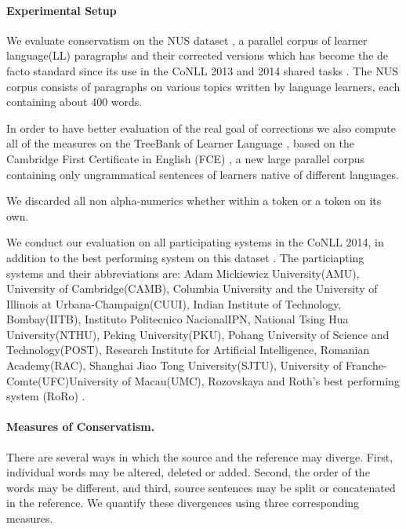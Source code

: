 \documentclass[english]{article}
\begin{document}
\paragraph{Experimental Setup \label{par:experimental_setup}}

We evaluate conservatism on the NUS dataset \cite{dahlmeier2013building}, a parallel
corpus of learner language(LL) paragraphs and their corrected versions which
has become the de facto standard since its use in the CoNLL 2013 and 2014
shared tasks \cite{kao2013conll,ng2014conll}.
The NUS corpus consists of paragraphs on various topics written by language learners,
each containing about 400 words.

In order to have better evaluation of the real goal of corrections we also
compute all of the measures on the TreeBank of Learner Language \cite{berzak2016universal},
based on the Cambridge First Certificate in English (FCE) \cite{yannakoudakis2011new},
a new large parallel corpus containing only ungrammatical sentences of learners
native of different languages.

We discarded all non alpha-numerics whether within a token or a token on its own.

We conduct our evaluation on all participating systems in the CoNLL 2014,
in addition to the best performing system on this dataset \cite{rozovskaya2014building}.
The particiapting systems and their abbreviations are: Adam Mickiewicz University(AMU), University of Cambridge(CAMB), Columbia University and the University of Illinois at Urbana-Champaign(CUUI), Indian Institute of Technology, Bombay(IITB), Instituto Politecnico NacionalIPN, National Tsing Hua University(NTHU), Peking University(PKU), Pohang University of Science and Technology(POST), Research Institute for Artificial Intelligence, Romanian Academy(RAC), Shanghai Jiao Tong University(SJTU), University of Franche-Comte(UFC)University of Macau(UMC), Rozovskaya and Roth's best performing system (RoRo) \cite{rozovskaya2016grammatical}.

\paragraph{Measures of Conservatism.} There are several ways in which the source and the reference
may diverge. First, individual words may be altered, deleted or added.
Second, the order of the words may be different,
and third, source sentences may be split or concatenated in the reference.
We quantify these divergences using three corresponding measures.
\end{document}
